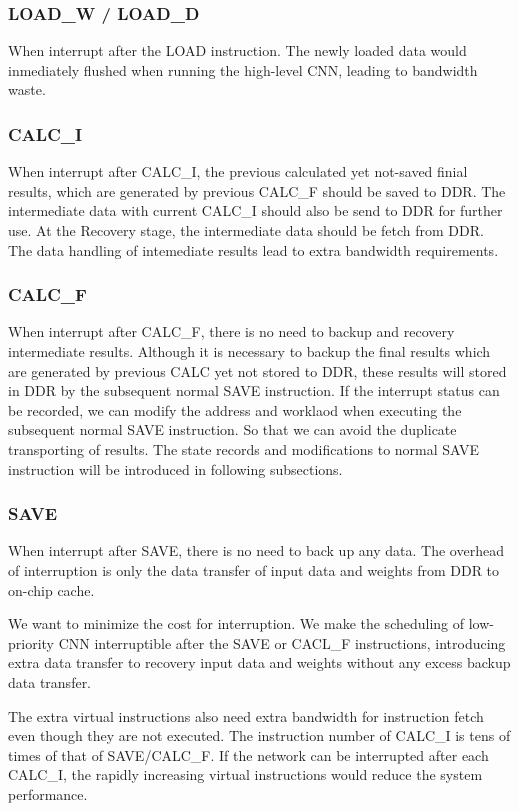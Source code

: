 \subsubsection{LOAD\_W / LOAD\_D }
When interrupt after the LOAD instruction. The newly loaded data would inmediately flushed when running the high-level CNN, leading to bandwidth waste.

\subsubsection{CALC\_I} 
When interrupt after CALC\_I, the previous calculated yet not-saved finial results, which are generated by previous CALC\_F should be saved to DDR. The intermediate data with current CALC\_I should also be send to DDR for further use. At the Recovery stage, the intermediate data should be fetch from DDR. The data handling of intemediate results lead to extra bandwidth requirements.


\subsubsection{CALC\_F}
When interrupt after CALC\_F, there is no need to backup and recovery intermediate results. Although it is necessary to backup the final results which are generated by previous CALC yet not stored to DDR, these results will stored in DDR by the subsequent normal SAVE instruction. If the interrupt status can be recorded, we can modify the address and worklaod when executing the subsequent normal SAVE instruction. So that we can avoid the duplicate transporting of results. The state records and modifications to normal SAVE instruction will be introduced in following subsections.

\subsubsection{SAVE}
When interrupt after SAVE, there is no need to back up any data. The overhead of interruption is only the data transfer of input data and weights from DDR to on-chip cache.

We want to minimize the cost for interruption. We make the scheduling of low-priority CNN interruptible after the SAVE or CACL\_F instructions, introducing extra data transfer to recovery input data and weights without any excess backup data transfer.

The extra virtual instructions also need extra bandwidth for instruction fetch even though they are not executed. The instruction number of CALC\_I is tens of times of that of SAVE/CALC\_F. If the network can be interrupted after each CALC\_I, the rapidly increasing virtual instructions would reduce the system performance.

